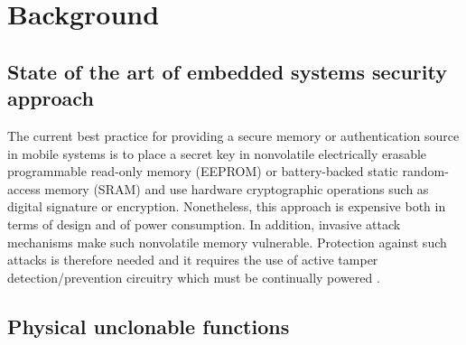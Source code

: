 \chapter{Background}

\section{State of the art of embedded systems security approach}

The current best practice for providing a secure memory or authentication source in mobile systems is to place a secret key in nonvolatile electrically erasable programmable read-only memory (EEPROM) or battery-backed static random-access memory (SRAM) and use hardware cryptographic operations such as digital signature or encryption. Nonetheless, this approach is expensive both in terms of design and of power consumption. In addition, invasive attack mechanisms make such nonvolatile memory vulnerable. Protection against such attacks is therefore needed and it requires the use of active tamper detection/prevention circuitry which must be continually powered \cite{PUF_IEEE_Herder}.

\section{Physical unclonable functions}\label{section:physicalUnclonableFunctions}

